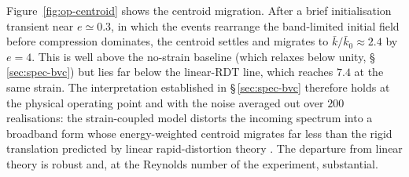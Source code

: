 \documentclass[lineno]{JFM-FLM_Au}
\begin{document}
Figure~\ref{fig:op-centroid} shows the centroid migration. After a brief
initialisation transient near $e\simeq0.3$, in which the events rearrange the
band-limited initial field before compression dominates, the centroid settles
and migrates to $\bar k/\bar k_0\approx2.4$ by $e=4$. This is well above the
no-strain baseline (which relaxes below unity, \S\,\ref{sec:spec-bvc}) but lies
far below the linear-RDT line, which reaches $7.4$ at the same strain. The
interpretation established in \S\,\ref{sec:spec-bvc} therefore holds at the
physical operating point and with the noise averaged out over $200$
realisations: the strain-coupled model distorts the incoming spectrum into a
broadband form whose energy-weighted centroid migrates far less than the rigid
translation predicted by linear rapid-distortion theory
\citep{BatchelorProudman1954,HuntCarruthers1990}. The departure from linear
theory is robust and, at the Reynolds number of the experiment, substantial.
\end{document}
